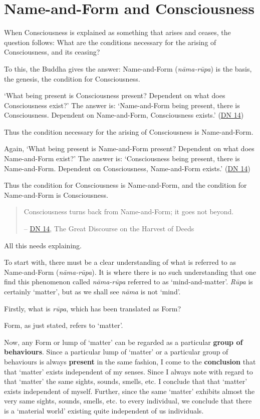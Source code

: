 \chapter{Name-and-Form and Consciousness}

When Consciousness is explained as something that arises and ceases, the question follows: What are the conditions necessary for the arising of Consciousness, and its ceasing?

To this, the Buddha gives the answer: Name-and-Form (\emph{nāma-rūpa}) is the basis, the genesis, the condition for Consciousness.

`What being present is Consciousness present? Dependent on what does Consciousness exist?' The answer is: `Name-and-Form being present, there is Consciousness. Dependent on Name-and-Form, Consciousness exists.' (\href{https://suttacentral.net/dn14/en/sujato}{DN 14})

Thus the condition necessary for the arising of Consciousness is Name-and-Form.

Again, `What being present is Name-and-Form present? Dependent on what does Name-and-Form exist?' The answer is: `Consciousness being present, there is Name-and-Form. Dependent on Consciousness, Name-and-Form exists.' (\href{https://suttacentral.net/dn14/en/sujato}{DN 14})

Thus the condition for Consciousness is Name-and-Form, and the condition for Name-and-Form is Consciousness.

\begin{quote}
Consciousness turns back from Name-and-Form; it goes not beyond.

 -- \href{https://suttacentral.net/dn14/en/sujato}{DN 14}, The Great Discourse on the Harvest of Deeds
\end{quote}

All this needs explaining.

To start with, there must be a clear understanding of what is referred to as Name-and-Form (\emph{nāma-rūpa}). It is where there is no such understanding that one find this phenomenon called \emph{nāma-rūpa} referred to as `mind-and-matter'. \emph{Rūpa} is certainly `matter', but as we shall see \emph{nāma} is not `mind'.

Firstly, what is \emph{rūpa}, which has been translated as Form?

Form, as just stated, refers to `matter'.

Now, any Form or lump of `matter' can be regarded as a particular \textbf{group of behaviours}. Since a particular lump of `matter' or a particular group of behaviours is always \textbf{present} in the same fashion, I come to the \textbf{conclusion} that that `matter' exists independent of my senses. Since I always note with regard to that `matter' the same sights, sounds, smells, etc. I conclude that that `matter' exists independent of myself. Further, since the same `matter' exhibits almost the very same sights, sounds, smells, etc. to every individual, we conclude that there is a `material world' existing quite independent of us individuals.

